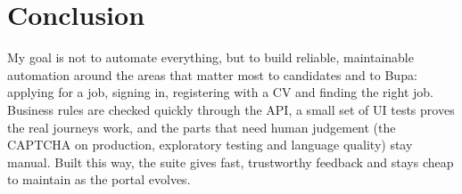 \documentclass[11pt,a4paper]{article}
\begin{document}
\section{Conclusion}

My goal is not to automate everything, but to build reliable, maintainable automation around the areas that matter
most to candidates and to Bupa: applying for a job, signing in, registering with a CV and finding the right job.
Business rules are checked quickly through the API, a small set of UI tests proves the real journeys work, and
the parts that need human judgement (the CAPTCHA on production, exploratory testing and language quality) stay
manual. Built this way, the suite gives fast, trustworthy feedback and stays cheap to maintain as the portal evolves.
\end{document}
